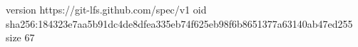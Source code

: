 version https://git-lfs.github.com/spec/v1
oid sha256:184323e7aa5b91dc4de8dfea335eb74f625eb98f6b8651377a63140ab47ed255
size 67
